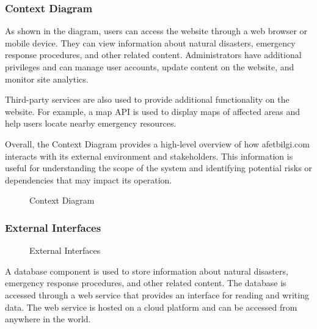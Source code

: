 \documentclass[a4paper]{article}
\begin{document}
    \subsubsection{Context Diagram}
    As shown in the diagram, users can access the website through a web browser or mobile device. They can view information about
    natural disasters, emergency response procedures, and other related content. Administrators have additional privileges and can
    manage user accounts, update content on the website, and monitor site analytics.

    Third-party services are also used to provide additional functionality on the website. For example, a map API is used to
    display maps of affected areas and help users locate nearby emergency resources.

    Overall, the Context Diagram provides a high-level overview of how afetbilgi.com interacts with its external environment and
    stakeholders. This information is useful for understanding the scope of the system and identifying potential risks or
    dependencies that may impact its operation.

    \begin{figure}[H] %
    
    \caption{Context Diagram}
    \end{figure}

    \subsubsection{External Interfaces}
    \begin{figure}[H]
    
    \caption{External Interfaces}
    \end{figure}

    A database component is used to store information about natural disasters, emergency response procedures, and other related
    content. The database is accessed through a web service that provides an interface for reading and writing data. The web
    service is hosted on a cloud platform and can be accessed from anywhere in the world.
    
    \begin{table}[H]
    \end{table}
    \vspace{1cm}
\end{document}
